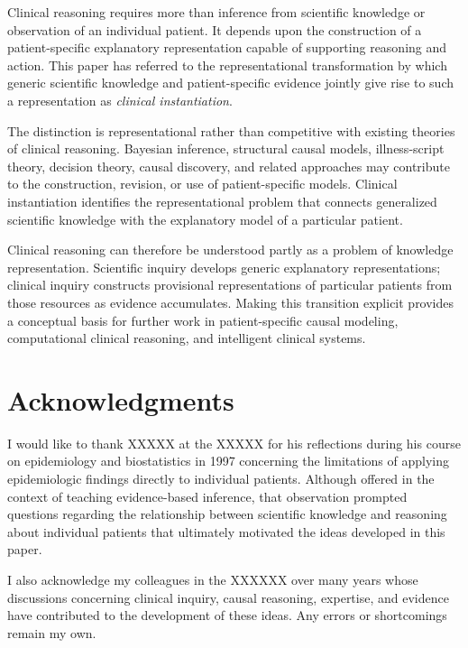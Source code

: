 \documentclass[11pt]{article}
\begin{document}
Clinical reasoning requires more than inference from scientific knowledge or observation of an individual patient. It depends upon the construction of a patient-specific explanatory representation capable of supporting reasoning and action. This paper has referred to the representational transformation by which generic scientific knowledge and patient-specific evidence jointly give rise to such a representation as \emph{clinical instantiation}.

The distinction is representational rather than competitive with existing theories of clinical reasoning. Bayesian inference, structural causal models, illness-script theory, decision theory, causal discovery, and related approaches may contribute to the construction, revision, or use of patient-specific models. Clinical instantiation identifies the representational problem that connects generalized scientific knowledge with the explanatory model of a particular patient.

Clinical reasoning can therefore be understood partly as a problem of knowledge representation. Scientific inquiry develops generic explanatory representations; clinical inquiry constructs provisional representations of particular patients from those resources as evidence accumulates. Making this transition explicit provides a conceptual basis for further work in patient-specific causal modeling, computational clinical reasoning, and intelligent clinical systems.

\section*{Acknowledgments}

I would like to thank XXXXX at the XXXXX for his reflections during his course on epidemiology and biostatistics in 1997 concerning the limitations of applying epidemiologic findings directly to individual patients. Although offered in the context of teaching evidence-based inference, that observation prompted questions regarding the relationship between scientific knowledge and reasoning about individual patients that ultimately motivated the ideas developed in this paper.

I also acknowledge my colleagues in the XXXXXX over many years whose discussions concerning clinical inquiry, causal reasoning, expertise, and evidence have contributed to the development of these ideas. Any errors or shortcomings remain my own.
\newpage
\printbibliography
\end{document}
